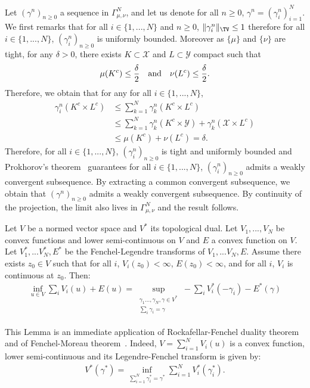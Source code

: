\begin{prv*}
Let $(\gamma^n)_{n\geq 0}$ a sequence in $\Gamma^N_{\mu,\nu}$, and let us denote for all $n\geq 0$, $\gamma^n=(\gamma^n_i)_{i=1}^N$. We first remarks that for all $i\in\{1,...,N\}$ and $n\geq 0$, $\Vert \gamma_i^n\Vert_{\TV}\leq 1$ therefore for all $i\in\{1,...,N\}$, $(\gamma^n_i)_{n\geq 0}$ is uniformly bounded. Moreover as $\{\mu\}$ and $\{\nu\}$ are tight, for any $\delta>0$, there exists $K\subset \mathcal{X} $ and $L\subset \mathcal{Y}$ compact such that 
\begin{align}
    \mu(K^c)\leq \frac{\delta}{2} \text{\quad and\quad }  \nu(L^c)\leq \frac{\delta}{2}.
\end{align}
Therefore, we obtain that for any for all $i\in\{1,...,N\}$,
\begin{align}
    \gamma_i^n(K^c\times L^c)&\leq \sum_{k=1}^N \gamma_k^n(K^c\times L^c)\\
    &\leq  \sum_{k=1}^N \gamma_k^n(K^c\times\mathcal{Y})+\gamma_k^n(\mathcal{X}\times L^c)\\
    &\leq  \mu(K^c) + \nu(L^c) = \delta.
\end{align}
Therefore, for all $i\in\{1,...,N\}$,  $(\gamma_i^n)_{n\geq 0}$ is tight and uniformly bounded and Prokhorov's theorem~\citep[Theorem A.3.15]{dupuis2011weak} guarantees for all $i\in\{1,...,N\}$,  $(\gamma_i^n)_{n\geq 0}$ admits a weakly convergent subsequence. By extracting a common convergent subsequence, we obtain that $(\gamma^n)_{n\geq 0}$ admits a weakly convergent subsequence. By continuity of the projection, the limit also lives in $\Gamma
^N_{\mu,\nu}$ and the result follows.
\end{prv*}
\begin{lemma}
\label{lem:rockafellar-gene}
Let $V$ be a normed vector space and $V^*$ its topological dual. Let $V_1,...,V_N$ be convex functions and lower semi-continuous on $V$ and $E$ a convex function on $V$. Let $V^*_1,...V^*_N,E^*$ be the Fenchel-Legendre transforms of $V_1,...V_N,E$. Assume there exists $z_0\in V$ such that for all $i$, $V_i(z_0)<\infty$, $E(z_0)<\infty$, and for all $i$, $V_i$ is continuous at $z_0$. Then:
\begin{align*}
\inf_{u\in V} \sum_i V_i(u) + E(u) = \sup\limits_{\substack{\gamma_1...,\gamma_N,\gamma\in V^*\\\sum_i \gamma_i = \gamma}}-\sum_i V^*_i(-\gamma_i)-E^*(\gamma)
\end{align*}
\end{lemma}
\begin{prv*}
This Lemma is an immediate application of Rockafellar-Fenchel duality theorem~\citep[Theorem 1.12]{brezis2010functional} and of Fenchel-Moreau theorem~\citep[Theorem 1.11]{brezis2010functional}. 
Indeed, $V = \sum\limits_{i=1}^N V_i(u)$ is a convex function, lower semi-continuous and its Legendre-Fenchel transform is given by:
\begin{align}
    V^{*}(\gamma^*)=\inf_{\sum\limits_{i=1}^N \gamma_{i}^*=\gamma^*}\sum_{i=1}^N V_i^{*}(\gamma_{i}^*).
\end{align}
\end{prv*}


